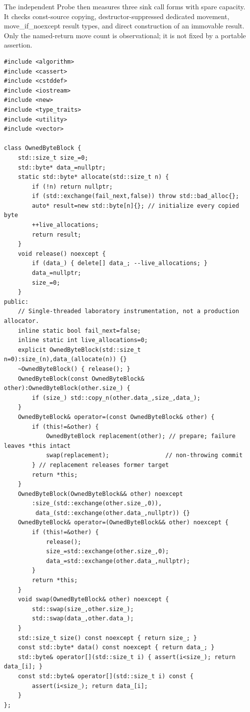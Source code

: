 The independent Probe then measures three sink call forms with spare capacity. It checks const-source copying, destructor-suppressed dedicated movement, move\_if\_noexcept result types, and direct construction of an immovable result. Only the named-return move count is observational; it is not fixed by a portable assertion.

\begin{verbatim}
#include <algorithm>
#include <cassert>
#include <cstddef>
#include <iostream>
#include <new>
#include <type_traits>
#include <utility>
#include <vector>

class OwnedByteBlock {
    std::size_t size_=0;
    std::byte* data_=nullptr;
    static std::byte* allocate(std::size_t n) {
        if (!n) return nullptr;
        if (std::exchange(fail_next,false)) throw std::bad_alloc{};
        auto* result=new std::byte[n]{}; // initialize every copied byte
        ++live_allocations;
        return result;
    }
    void release() noexcept {
        if (data_) { delete[] data_; --live_allocations; }
        data_=nullptr;
        size_=0;
    }
public:
    // Single-threaded laboratory instrumentation, not a production allocator.
    inline static bool fail_next=false;
    inline static int live_allocations=0;
    explicit OwnedByteBlock(std::size_t n=0):size_(n),data_(allocate(n)) {}
    ~OwnedByteBlock() { release(); }
    OwnedByteBlock(const OwnedByteBlock& other):OwnedByteBlock(other.size_) {
        if (size_) std::copy_n(other.data_,size_,data_);
    }
    OwnedByteBlock& operator=(const OwnedByteBlock& other) {
        if (this!=&other) {
            OwnedByteBlock replacement(other); // prepare; failure leaves *this intact
            swap(replacement);                // non-throwing commit
        } // replacement releases former target
        return *this;
    }
    OwnedByteBlock(OwnedByteBlock&& other) noexcept
        :size_(std::exchange(other.size_,0)),
         data_(std::exchange(other.data_,nullptr)) {}
    OwnedByteBlock& operator=(OwnedByteBlock&& other) noexcept {
        if (this!=&other) {
            release();
            size_=std::exchange(other.size_,0);
            data_=std::exchange(other.data_,nullptr);
        }
        return *this;
    }
    void swap(OwnedByteBlock& other) noexcept {
        std::swap(size_,other.size_);
        std::swap(data_,other.data_);
    }
    std::size_t size() const noexcept { return size_; }
    const std::byte* data() const noexcept { return data_; }
    std::byte& operator[](std::size_t i) { assert(i<size_); return data_[i]; }
    const std::byte& operator[](std::size_t i) const {
        assert(i<size_); return data_[i];
    }
};


\end{verbatim}
